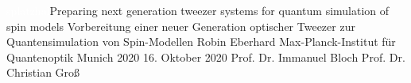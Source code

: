


\LMUTitle
      {\textcolor{white}{splatzhal}Preparing next generation tweezer systems for quantum simulation of spin models} %
      {Vorbereitung einer neuer Generation optischer Tweezer zur Quantensimulation von Spin-Modellen}%
      {Robin Eberhard}                       %
      {Max-Planck-Institut für Quantenoptik}  %
      {Munich 2020}                           %
      {16. Oktober 2020}                       			 %
      {Prof. Dr. Immanuel Bloch}                  %
      {Prof. Dr. Christian Groß}                    %



\tableofcontents

\cleardoublepage{}


%









\printbibliography


